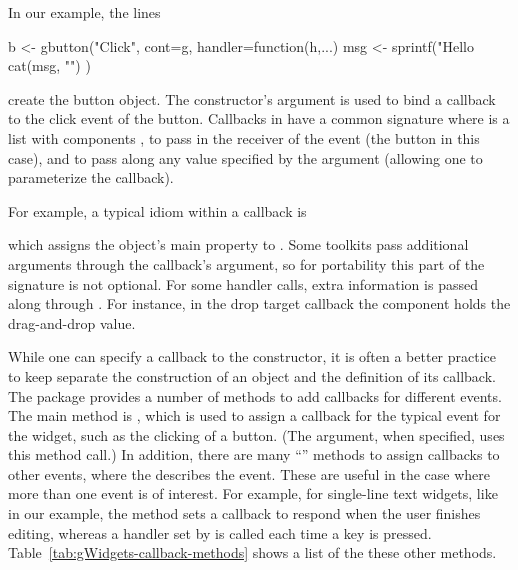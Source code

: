 


In our example, the lines
\begin{Schunk}
\begin{Sinput}
 b <- gbutton("Click", cont=g, handler=function(h,...) {
   msg <- sprintf("Hello %
   cat(msg, "\n")
 })
\end{Sinput}
\end{Schunk}
%
create the button object. The constructor's argument  is
used to bind a callback to the click event of the button. Callbacks in
 have a common signature  where 
is a list with components , to pass in the receiver of the
event (the button in this case), and  to pass along any
value specified by the  argument (allowing one to
parameterize the callback).

For example, a typical idiom within a callback is
\begin{Schunk}
\end{Schunk}
%
which assigns the object's main property to .  Some
toolkits pass additional arguments through the callback's 
argument, so for portability this part of the signature is not optional. For some
handler calls, extra information is passed along through . For instance, in the drop
target callback the component  
holds the drag-and-drop value.


While one can specify a callback to the constructor, it is often a
better practice to keep separate the construction of an object and the
definition of its callback.  The package provides a number of methods
to add callbacks for different events. The main method is
, which is used to assign a callback for the
typical event for the widget, such as the clicking of a button. (The
 argument, when specified, uses this method call.)  In
addition, there are many ``'' methods to assign
callbacks to other events, where the  describes the
event. These are useful in the case where more than one event is of
interest. For example, for single-line text widgets, like  in
our example, the  method sets a callback to
respond when the user finishes editing, whereas a handler set by
 is called each time a key is pressed.
Table~\ref{tab:gWidgets-callback-methods} shows a list of the these
other methods.

